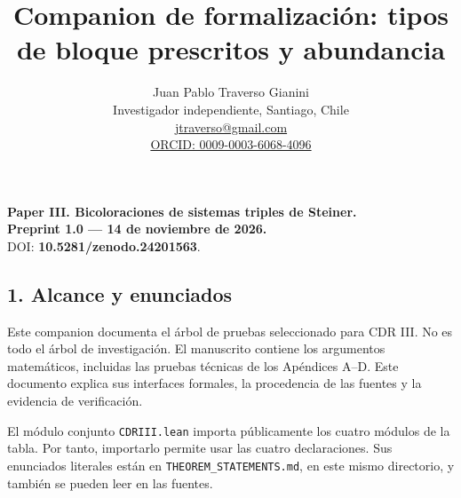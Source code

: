 \documentclass[spanish,11pt,a4paper]{article}
\title{Companion de formalización: tipos de bloque prescritos y abundancia}
\author{Juan Pablo Traverso Gianini\\\small Investigador independiente, Santiago, Chile\\\small \href{mailto:jtraverso@gmail.com}{jtraverso@gmail.com}\\\small \href{https://orcid.org/0009-0003-6068-4096}{ORCID: 0009-0003-6068-4096}}
\date{}
\begin{document}
\raggedbottom\maketitle
\textbf{Paper III. Bicoloraciones de sistemas triples de Steiner.}\\
\textbf{Preprint 1.0 --- 14 de noviembre de 2026.}\\
DOI: \textbf{10.5281/zenodo.24201563}.

\subsection{1. Alcance y enunciados}\label{alcance-y-enunciados}

Este companion documenta el árbol de pruebas seleccionado para CDR III. No es todo el árbol de investigación. El manuscrito contiene los argumentos matemáticos, incluidas las pruebas técnicas de los Apéndices A--D. Este documento explica sus interfaces formales, la procedencia de las fuentes y la evidencia de verificación.

El módulo conjunto \texttt{CDRIII.\allowbreak{}lean} importa públicamente los cuatro módulos de la tabla. Por tanto, importarlo permite usar las cuatro declaraciones. Sus enunciados literales están en \texttt{THEOREM\_\allowbreak{}STATEMENTS.\allowbreak{}md}, en este mismo directorio, y también se pueden leer en las fuentes.
\end{document}
